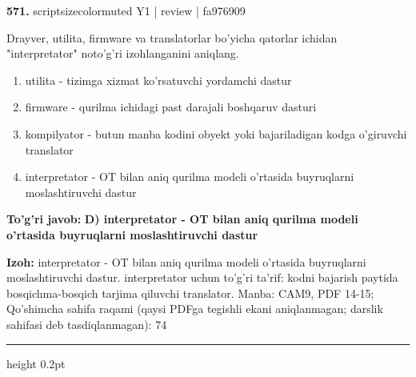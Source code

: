 \documentclass[10pt,a4paper]{article}
\begin{document}
{\bfseries\sffamily\color{ink} 571.} {scriptsizecolor{muted} Y1 | review | fa976909}
\par
Drayver, utilita, firmware va translatorlar bo'yicha qatorlar ichidan "interpretator" noto'g'ri izohlanganini aniqlang.
\begin{enumerate}[label=\Alph*),leftmargin=9mm]
\item utilita - tizimga xizmat ko'rsatuvchi yordamchi dastur
\item firmware - qurilma ichidagi past darajali boshqaruv dasturi
\item kompilyator - butun manba kodini obyekt yoki bajariladigan kodga o'giruvchi translator
\item interpretator - OT bilan aniq qurilma modeli o'rtasida buyruqlarni moslashtiruvchi dastur
\end{enumerate}
\begin{tcolorbox}[enhanced,breakable,colback=teal!4,colframe=teal!60!black,boxrule=0.45pt,arc=1.2mm,left=2.7mm,right=2.7mm,top=1.8mm,bottom=1.8mm,before skip=2mm,after skip=2mm]
{\bfseries\sffamily\color{teal}To'g'ri javob:} \textbf{D) interpretator - OT bilan aniq qurilma modeli o'rtasida buyruqlarni moslashtiruvchi dastur}
\par\smallskip
{\bfseries Izoh:} interpretator - OT bilan aniq qurilma modeli o'rtasida buyruqlarni moslashtiruvchi dastur. interpretator uchun to'g'ri ta'rif: kodni bajarish paytida bosqichma-bosqich tarjima qiluvchi translator. Manba: CAM9, PDF 14-15; Qo'shimcha sahifa raqami (qaysi PDFga tegishli ekani aniqlanmagan; darslik sahifasi deb tasdiqlanmagan): 74
\end{tcolorbox}
\vspace{2mm}\hrule height 0.2pt\vspace{3mm}
\end{document}
